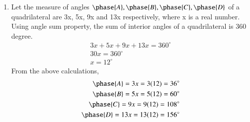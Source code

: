 \renewcommand{\theequation}{\theenumi}
\begin{enumerate}[label=\arabic*.,ref=\thesubsection.\theenumi]
%
\item Let the measure of angles $\phase{A},\phase{B},\phase{C},\phase{D} $ of a quadrilateral are 3x, 5x, 9x and 13x respectively, where x is a real number.
\\
Using angle sum property, the sum of interior angles of a quadrilateral is 360 degree.
\begin{align}
3x+5x+9x+13x=360^{\circ}
\\
30x=360^{\circ}
\\
x=12^{\circ}
\end{align}
 From the above calculations, 
 \begin{align}
 \phase{A}=3x=3(12)=36^{\circ}
 \\
 \phase{B}=5x=5(12)=60^{\circ}
 \\
 \phase{C}=9x=9(12)=108^{\circ}
 \\
 \phase{D}=13x=13(12)=156^{\circ}
 \end{align}
\end{enumerate}